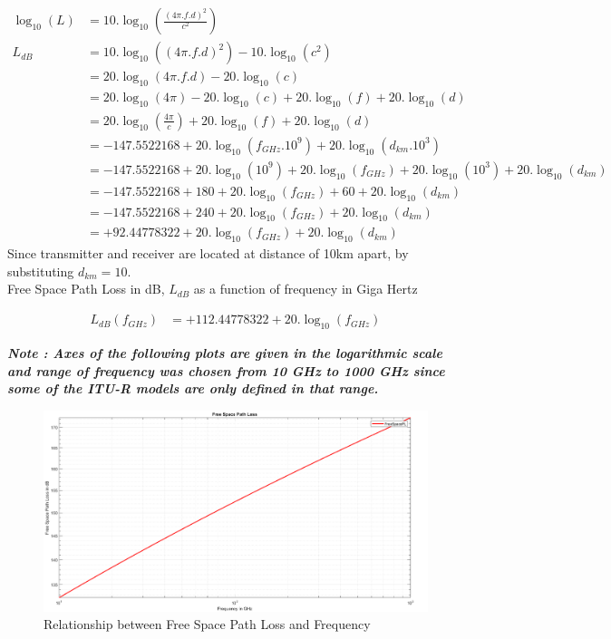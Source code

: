 \documentclass[a4paper,11pt]{article}%
\begin{document}
\[
\begin{split}
\log_{10}(L) &= 10.\log_{10}(\frac{(4\pi.f.d)^2}{c^2})\\
L_{dB}& = 10.\log_{10}((4\pi.f.d)^2) - 10.\log_{10}(c^2)\\
&=20.\log_{10}(4\pi.f.d)-20.\log_{10}(c)\\
&=20.\log_{10}(4\pi)-20.\log_{10}(c) + 20.\log_{10}(f) + 20.\log_{10}(d)\\
&=20.\log_{10}(\frac{4\pi}{c}) + 20.\log_{10}(f) + 20.\log_{10}(d)\\
&= -147.5522168 + 20.\log_{10}(f_{GHz}.10^9) + 20.\log_{10}(d_{km}.10^3)\\
& = -147.5522168 + 20.\log_{10}(10^9)+ 20.\log_{10}(f_{GHz}) + 20.\log_{10}(10^3) + 20.\log_{10}(d_{km})\\
&= -147.5522168 + 180+ 20.\log_{10}(f_{GHz}) + 60 + 20.\log_{10}(d_{km})\\
&= -147.5522168 + 240+ 20.\log_{10}(f_{GHz}) + 20.\log_{10}(d_{km})\\
&= +92.44778322+20.\log_{10}(f_{GHz}) + 20.\log_{10}(d_{km})
\end{split}
\]
Since transmitter and receiver are located at distance of 10km apart, by substituting $d_{km}= 10$.\\

Free Space Path Loss in dB, $L_{dB}$ as a function of frequency in Giga Hertz

\[
\begin{split}
L_{dB}(f_{GHz})&=  +112.44778322+20.\log_{10}(f_{GHz})
\end{split}
\]

\textbf{\textit{Note : Axes of the following plots are given in the logarithmic scale and range of frequency was chosen from 10 GHz to 1000 GHz since some of the ITU-R models are only defined in that range.}}

\begin{figure}[h]
	\centering
	\includegraphics[scale=0.35]{figures/fspl}
	\caption{Relationship between Free Space Path Loss and Frequency}
\end{figure}
\end{document}
